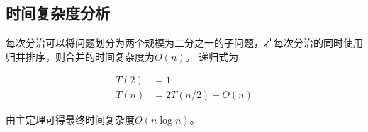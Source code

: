 \subsection*{时间复杂度分析}

每次分治可以将问题划分为两个规模为二分之一的子问题，若每次分治的同时使用归并排序，则合并的时间复杂度为$O(n)$。
递归式为

\begin{equation}
    \begin{aligned}
        T(2) &= 1\\
        T(n) & =2T(n/2) + O(n)
    \end{aligned}
    \nonumber
\end{equation}

由主定理可得最终时间复杂度$O(n \log n)$。